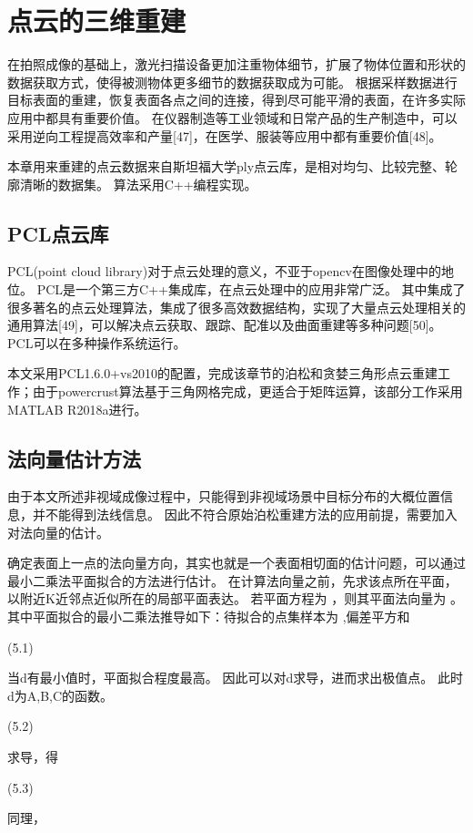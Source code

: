 \chapter{点云的三维重建}\label{chap:3DRecon}

在拍照成像的基础上，激光扫描设备更加注重物体细节，扩展了物体位置和形状的数据获取方式，使得被测物体更多细节的数据获取成为可能。
根据采样数据进行目标表面的重建，恢复表面各点之间的连接，得到尽可能平滑的表面，在许多实际应用中都具有重要价值。
在仪器制造等工业领域和日常产品的生产制造中，可以采用逆向工程提高效率和产量[47]，在医学、服装等应用中都有重要价值[48]。

本章用来重建的点云数据来自斯坦福大学ply点云库，是相对均匀、比较完整、轮廓清晰的数据集。
算法采用C++编程实现。

\section{PCL点云库}
PCL(point cloud library)对于点云处理的意义，不亚于opencv在图像处理中的地位。
PCL是一个第三方C++集成库，在点云处理中的应用非常广泛。
其中集成了很多著名的点云处理算法，集成了很多高效数据结构，实现了大量点云处理相关的通用算法[49]，可以解决点云获取、跟踪、配准以及曲面重建等多种问题[50]。
PCL可以在多种操作系统运行。

本文采用PCL1.6.0+vs2010的配置，完成该章节的泊松和贪婪三角形点云重建工作；由于powercrust算法基于三角网格完成，更适合于矩阵运算，该部分工作采用MATLAB R2018a进行。

\section{法向量估计方法}
由于本文所述非视域成像过程中，只能得到非视域场景中目标分布的大概位置信息，并不能得到法线信息。
因此不符合原始泊松重建方法的应用前提，需要加入对法向量的估计。

确定表面上一点的法向量方向，其实也就是一个表面相切面的估计问题，可以通过最小二乘法平面拟合的方法进行估计。
在计算法向量之前，先求该点所在平面，以附近K近邻点近似所在的局部平面表达。
若平面方程为 ，则其平面法向量为 。
其中平面拟合的最小二乘法推导如下：待拟合的点集样本为 ,偏差平方和

	  	(5.1)

当d有最小值时，平面拟合程度最高。
因此可以对d求导，进而求出极值点。
此时d为A,B,C的函数。


	  	(5.2)

求导，得

	  	(5.3)

同理，

